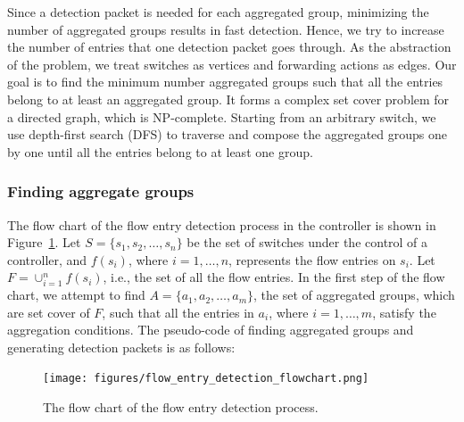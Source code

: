 \documentclass[conference]{IEEEtran}
\begin{document}
\setlength{\textfloatsep}{4pt}
\setlength{\floatsep}{4pt}
\setlength{\intextsep}{3pt}
\setlength{\dbltextfloatsep}{4pt}
\setlength{\dblfloatsep}{4pt}

Since a detection packet is needed for each aggregated group, minimizing the number of aggregated groups results in fast detection. Hence, we try to increase the number of entries that one detection packet goes through. As the abstraction of the problem, we treat switches as vertices and forwarding actions as edges. Our goal is to find the minimum number aggregated groups such that all the entries belong to at least an aggregated group. It forms a complex set cover problem for a directed graph, which is NP-complete. Starting from an arbitrary switch, we use depth-first search (DFS) to traverse and compose the aggregated groups one by one until all the entries belong to at least one group. 

\subsubsection{Finding aggregate groups}
\label{Aggregated_group_finding}

The flow chart of the flow entry detection process in the controller is shown in Figure~\ref{flow_entry_detection_flowchart}. Let $S=\{s_1,s_2,\ldots,s_n\}$ be the set of switches under the control of a controller, and $f(s_i)$, where $i=1,\ldots,n$, represents the flow entries on $s_i$. Let $F=\cup_{i=1}^n f(s_i)$, i.e., the set of all the flow entries. In the first step of the flow chart, we attempt to find $A=\{a_1, a_2, \ldots, a_m\}$, the set of aggregated groups, which are set cover of $F$, such that all the entries in $a_i$, where $i=1,\ldots,m$, satisfy the aggregation conditions. The pseudo-code of finding aggregated groups and generating detection packets is as follows:

\begin{figure}[ht]
\centering
\texttt{[image: figures/flow\_entry\_detection\_flowchart.png]}
\caption{The flow chart of the flow entry detection process.}
\label{flow_entry_detection_flowchart}
\end{figure}
\end{document}
